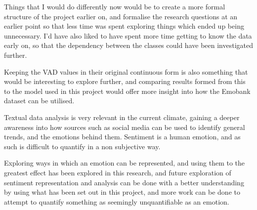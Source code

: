\documentclass[11pt]{article}
\begin{document}
Things that I would do differently now would be to create a more formal structure of the project earlier on, and formalise the research questions at an earlier point so that less time was spent exploring things which ended up being unnecessary. I'd have also liked to have spent more time getting to know the data early on, so that the dependency between the classes could have been investigated further. 

Keeping the VAD values in their original continuous form is also something that would be interesting to explore further, and comparing results formed from this to the model used in this project would offer more insight into how the Emobank dataset can be utilised.

Textual data analysis is very relevant in the current climate, gaining a deeper awareness into how sources such as social media can be used to identify general trends, and the emotions behind them. Sentiment is a human emotion, and as such is difficult to quantify in a non subjective way.

Exploring ways in which an emotion can be represented, and using them to the greatest effect has been explored in this research, and future exploration of sentiment representation and analysis can be done with a better understanding by using what has been set out in this project, and more work can be done to attempt to quantify something as seemingly unquantifiable as an emotion.

\pagebreak






\end{document}
